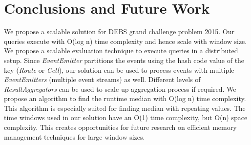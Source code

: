 \section{Conclusions and Future Work}

We propose a scalable solution for DEBS grand challenge problem 2015. Our queries execute with O(log n) time complexity and hence scale with window size. We propose a scalable evaluation technique to execute queries in a distributed setup. Since \textit{EventEmitter} partitions the events using the  hash code value of the key (\textit{Route} or \textit{Cell}), our solution can be used to process events with multiple \textit{EventEmitters} (multiple event streams) as well. Different levels of \textit{ResultAggregators} can be used to scale up aggregation process if required. We propose an algorithm to find the runtime median with O(log n) time complexity. This algorithm is especially suited for finding median with repeating values. The time windows used in our solution have an O(1) time complexity, but O(n) space complexity. This creates opportunities for future research on efficient memory management techniques for large window sizes.

